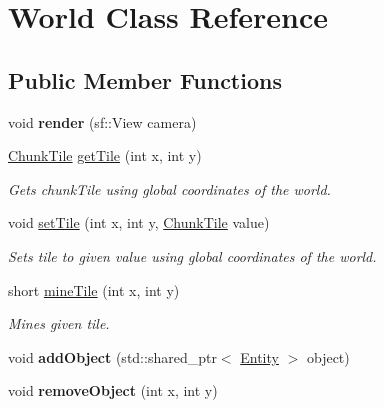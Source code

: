 \hypertarget{classWorld}{\section{World Class Reference}
\label{classWorld}
}
\subsection*{Public Member Functions}
\begin{DoxyCompactItemize}
\item 
\hypertarget{classWorld_a4ed73f6a1537aee3fa26a82de6a35437}{void {\bfseries render} (sf\-::\-View camera)}\label{classWorld_a4ed73f6a1537aee3fa26a82de6a35437}

\item 
\hypertarget{classWorld_ad8d693762cae3c31ec90fef9b44b97bf}{\hyperlink{classChunkTile}{Chunk\-Tile} \hyperlink{classWorld_ad8d693762cae3c31ec90fef9b44b97bf}{get\-Tile} (int x, int y)}\label{classWorld_ad8d693762cae3c31ec90fef9b44b97bf}

\begin{DoxyCompactList}\small\item\em Gets chunk\-Tile using global coordinates of the world. \end{DoxyCompactList}\item 
\hypertarget{classWorld_a9d374f8600da3aa484e48a5887772340}{void \hyperlink{classWorld_a9d374f8600da3aa484e48a5887772340}{set\-Tile} (int x, int y, \hyperlink{classChunkTile}{Chunk\-Tile} value)}\label{classWorld_a9d374f8600da3aa484e48a5887772340}

\begin{DoxyCompactList}\small\item\em Sets tile to given value using global coordinates of the world. \end{DoxyCompactList}\item 
short \hyperlink{classWorld_a1bbfac1b517a991c30aa96b57d04d265}{mine\-Tile} (int x, int y)
\begin{DoxyCompactList}\small\item\em Mines given tile. \end{DoxyCompactList}\item 
\hypertarget{classWorld_a3ffaf54defefc9038db98ef2595b2d00}{void {\bfseries add\-Object} (std\-::shared\-\_\-ptr$<$ \hyperlink{classEntity}{Entity} $>$ object)}\label{classWorld_a3ffaf54defefc9038db98ef2595b2d00}

\item 
\hypertarget{classWorld_a51263169cad974284ea01a23907baaa6}{void {\bfseries remove\-Object} (int x, int y)}\label{classWorld_a51263169cad974284ea01a23907baaa6}


\end{DoxyCompactItemize}
